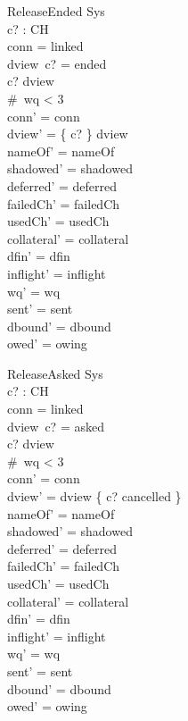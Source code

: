 \documentclass[a4paper,10pt,fleqn]{article}
\begin{document}
\begin{schema}{ReleaseEnded}
  \Delta Sys \\
  c? : CH \\
\where
  conn = linked \\
  dview~c? = ended \\
  c? \in \dom dview \\
  \#~wq < 3 \\
  conn' = conn \\
  dview' = \{ c? \} \ndres dview \\
  nameOf' = nameOf \\
  shadowed' = shadowed \\
  deferred' = deferred \\
  failedCh' = failedCh \\
  usedCh' = usedCh \\
  collateral' = collateral \\
  dfin' = dfin \\
  inflight' = inflight \\
  wq' = wq \\
  sent' = sent \\
  dbound' = dbound \\
  owed' = owing
\end{schema}

\begin{schema}{ReleaseAsked}
  \Delta Sys \\
  c? : CH \\
\where
  conn = linked \\
  dview~c? = asked \\
  c? \in \dom dview \\
  \#~wq < 3 \\
  conn' = conn \\
  dview' = dview \oplus \{ c? \mapsto cancelled \} \\
  nameOf' = nameOf \\
  shadowed' = shadowed \\
  deferred' = deferred \\
  failedCh' = failedCh \\
  usedCh' = usedCh \\
  collateral' = collateral \\
  dfin' = dfin \\
  inflight' = inflight \\
  wq' = wq \\
  sent' = sent \\
  dbound' = dbound \\
  owed' = owing
\end{schema}
\end{document}
